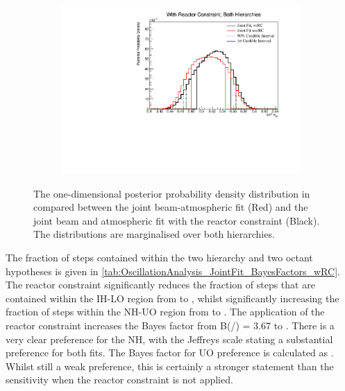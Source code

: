 \begin{figure}[h]
  \begin{subfigure}[t]{0.98\textwidth}
    \includegraphics[width=\textwidth, trim={0mm 0mm 0mm 0mm}, clip,page=1]{Figures/OA/JointFit_wRC_Comp/ContourComparison_1D_th23_BH_2_wRC_woRC_UnSmeared_CredibleInterval.pdf}
  \end{subfigure}
  \caption{The one-dimensional posterior probability density distribution in  compared between the joint beam-atmospheric fit (Red) and the joint beam and atmospheric fit with the reactor constraint (Black). The distributions are marginalised over both hierarchies.}
  \label{fig:OscillationAnalysis_JointFit_wRC_Comp_TH23}
\end{figure}

The fraction of steps contained within the two hierarchy and two octant hypotheses is given in \autoref{tab:OscillationAnalysis_JointFit_BayesFactors_wRC}. The reactor constraint significantly reduces the fraction of steps that are contained within the IH-LO region from  to , whilst significantly increasing the fraction of steps within the NH-UO region from  to . The application of the reactor constraint increases the Bayes factor from {B(/) = 3.67} to . There is a very clear preference for the NH, with the Jeffreys scale stating a substantial preference for both fits. The Bayes factor for UO preference is calculated as  . Whilst still a weak preference, this is certainly a stronger statement than the sensitivity when the reactor constraint is not applied.

